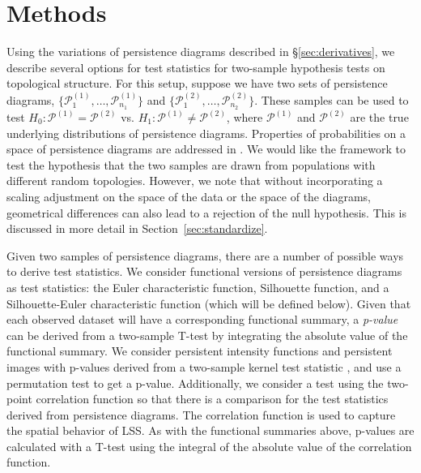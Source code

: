 \documentclass[12pt]{article}
\begin{document}

\section{Methods} \label{sec:methods}
\begin{sloppypar}
Using the variations of persistence diagrams described in \S \ref{sec:derivatives},
we describe several options for test statistics for two-sample hypothesis tests on topological structure.
For this setup, suppose we have two sets of persistence diagrams, $\{\mathcal P_1^{(1)}, \ldots, \mathcal P_{n_1}^{(1)}\}$ and $\{\mathcal P_1^{(2)}, \ldots, \mathcal P_{n_2}^{(2)}\}$.  These samples can be used to test $H_0: \mathcal
P^{(1)} = \mathcal P^{(2)}$ vs. $H_1: \mathcal P^{(1)} \neq \mathcal P^{(2)}$, where $\mathcal P^{(1)}$ and $\mathcal P^{(2)}$ are the true underlying distributions of persistence diagrams.  Properties of probabilities on a space of persistence diagrams are addressed in \citep{Mileyko:2011aa}. We would like the framework to test the hypothesis that the two samples are drawn from populations with different random topologies. However, we note that without incorporating a scaling adjustment on the space of the data or the space of the diagrams, geometrical differences can also lead to a rejection of the null hypothesis. This is discussed in more detail in Section~\ref{sec:standardize}.
\end{sloppypar}

Given two samples of persistence diagrams, there are a number of possible ways to derive test statistics. We consider functional versions of persistence diagrams as test statistics:  the Euler characteristic function, Silhouette function, and a Silhouette-Euler characteristic function (which will be defined below).
Given that each observed dataset will have a corresponding functional summary, a \emph{p-value} can be derived from a two-sample T-test by integrating the absolute value of the functional summary.
We consider persistent intensity functions and persistent images with p-values derived from a two-sample kernel test statistic \citep{gretton2012kernel}, and use a permutation test to get a p-value.
%
Additionally, we consider a test using the two-point correlation function so that there is a comparison for the test statistics derived from persistence diagrams.  The correlation function is used to capture the spatial behavior of LSS.
As with the functional summaries above, p-values are calculated with a T-test using the integral of the absolute value of the correlation function.
\end{document}
